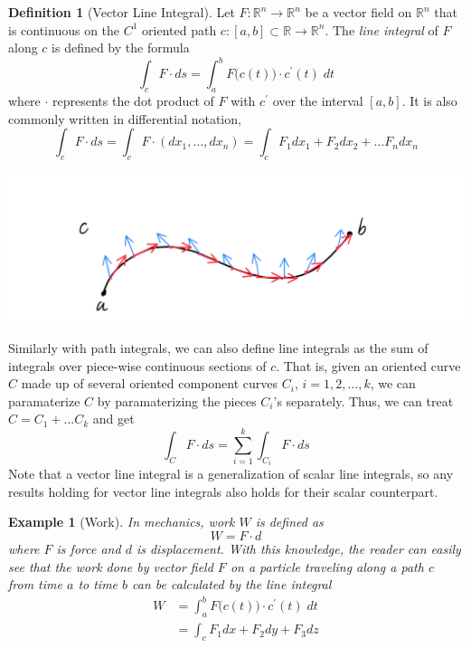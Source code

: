 \documentclass{article}
\newtheorem{example}{Example}[section]
\theoremstyle{remark}
\theoremstyle{definition}
\newtheorem{definition}{Definition}[section]
\begin{document}
\begin{definition}[Vector Line Integral]
Let $F: \mathbb{R}^n \longrightarrow \mathbb{R}^n$ be a vector field on $\mathbb{R}^n$ that is continuous on the $C^1$ oriented path $c: [a, b] \subset \mathbb{R} \longrightarrow \mathbb{R}^n$. The \textit{line integral} of $F$ along $c$ is defined by the formula 
\[\int_c F \cdot d s = \int_a^b F\big( c(t)\big) \cdot c^\prime (t) \; d t\]
where $\cdot$ represents the dot product of $F$ with $c^\prime$ over the interval $[a,b]$. It is also commonly written in differential notation, 
\[\int_c F \cdot ds = \int_c F \cdot (dx_1, \ldots, d x_n) = \int_c F_1 dx_1 + F_2 dx_2 + \ldots F_n dx_n\]
\begin{center}
    \includegraphics[scale=0.27]{img/Vector_Line_Integral.PNG}
\end{center}
 Similarly with path integrals, we can also define line integrals as the sum of integrals over piece-wise continuous sections of $c$. That is, given an oriented curve $C$ made up of several oriented component curves $C_i$, $i = 1, 2, ..., k$, we can paramaterize $C$ by paramaterizing the pieces $C_i$'s separately. Thus, we can treat $C = C_1 + ... C_k$ and get
\[\int_C F \cdot d s = \sum_{i = 1}^k \int_{C_i} F \cdot d s\]
Note that a vector line integral is a generalization of scalar line integrals, so any results holding for vector line integrals also holds for their scalar counterpart. 
\end{definition}

\begin{example}[Work]
In mechanics, work $W$ is defined as 
\[W = F \cdot d\]
where $F$ is force and $d$ is displacement. With this knowledge, the reader can easily see that the work done by vector field $F$ on a particle traveling along a path $c$ from time $a$ to time $b$ can be calculated by the line integral
\begin{align*}
    W & = \int_a^b F\big( c(t)\big) \cdot c^\prime (t) \; d t \\
    & = \int_c F_1 dx + F_2 dy + F_3 dz
\end{align*}
\end{example}
\end{document}
